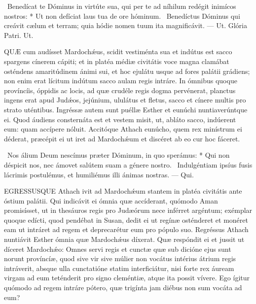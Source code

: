 \R\ Benedícat te Dóminus in virtúte sua, qui per te ad níhilum redégit inimícos nostros: * Ut non defíciat laus tua de ore hóminum. \V\ Benedíctus Dóminus qui creávit cælum et terram; quia hódie nomen tuum ita magnificávit. — Ut. Glória Patri. Ut.




\lettrine[lines=2]{Q}{UÆ} cum audísset Mardochǽus, scidit vestiménta sua et indútus est sacco spargens cínerem cápiti; et in platéa médiæ civitátis voce magna clamábat osténdens amaritúdinem ánimi sui, et hoc ejulátu usque ad fores palátii grádiens; non enim erat lícitum indútum sacco aulam regis intráre. In ómnibus quoque províncíis, óppidis ac locis, ad quæ crudéle regis dogma pervénerat, planctus ingens erat apud Judǽos, jejúnium, ululátus et fletus, sacco et cínere multis pro strato uténtibus. Ingréssæ autem sunt puéllæ Esther et eunúchi nuntiaverúntque ei. Quod áudiens consternáta est et vestem misit, ut, abláto sacco, indúerent eum: quam accípere nóluit. Accitóque Athach eunúcho, quem rex minístrum ei déderat, præcépit ei ut iret ad Mardochǽum et discéret ab eo cur hoc fáceret.

\R\ Nos álium Deum nescímus præter Dóminum, in quo sperámus: * Qui non déspicit nos, nec ámovet salútem suam a génere nostro. \V\ Indulgéntiam ipsíus fusis lácrimis postulémus, et humiliémus illi ánimas nostras. — Qui.


\lettrine[lines=2]{E}{GRESSUSQUE} Athach ivit ad Mardochǽum stantem in platéa civitátis ante óstium palátii. Qui indicávit ei ómnia quæ accíderant, quómodo Aman promisísset, ut in thesáuros regis pro Judæórum nece inférret argéntum; exémplar quoque edícti, quod pendébat in Susan, dedit ei ut regínæ osténderet et monéret eam ut intráret ad regem et deprecarétur eum pro pópulo suo. Regréssus Athach nuntiávit Esther ómnia quæ Mardochǽus díxerat. Quæ respóndit ei et jussit ut díceret Mardochǽo: Omnes servi regis et cunctæ quæ sub dicióne ejus sunt norunt províncíæ, quod sive vir sive múlier non vocátus intérius átrium regis intráverit, absque ulla cunctatióne statim interficiátur, nisi forte rex áuream virgam ad eum teténderit pro signo cleméntiæ, atque ita possit vívere. Ego ígitur quómodo ad regem intráre pótero, quæ trigínta jam diébus non sum vocáta ad eum?

